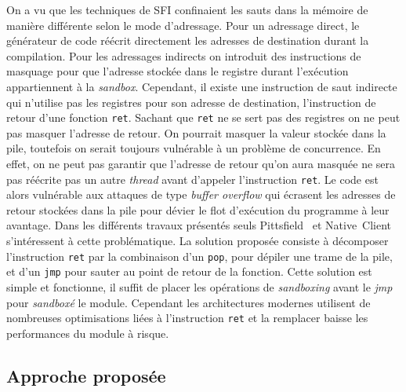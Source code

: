 \documentclass[11pt]{sdm}
\begin{document}
On a vu que les techniques de SFI confinaient les sauts dans la mémoire de manière différente selon le mode d'adressage. Pour un adressage direct, le générateur de code réécrit directement les adresses de destination durant la compilation. Pour les adressages indirects on introduit des instructions de masquage pour que l'adresse stockée dans le registre durant l'exécution appartiennent à la \textit{sandbox}. Cependant, il existe une instruction de saut indirecte qui n'utilise pas les registres pour son adresse de destination, l'instruction de retour d'une fonction \texttt{ret}. 
Sachant que \texttt{ret} ne se sert pas des registres on ne peut pas masquer l'adresse de retour. On pourrait masquer la valeur stockée dans la pile, toutefois on serait toujours vulnérable à un problème de concurrence. En effet, on ne peut pas garantir que l'adresse de retour qu'on aura masquée ne sera pas réécrite pas un autre \textit{thread} avant d'appeler l'instruction \texttt{ret}. Le code est alors vulnérable aux attaques de type \textit{buffer overflow} qui écrasent les adresses de retour stockées dans la pile pour dévier le flot d'exécution du programme à leur avantage.
Dans les différents travaux présentés seuls Pittsfield~\cite{Mccamant_evaluatingsfi} et Native~Client~\cite{Yee:2010:NCS:1629175.1629203} s'intéressent à cette problématique. La solution proposée consiste à décomposer l'instruction \texttt{ret} par la combinaison d'un \texttt{pop}, pour dépiler une trame de la pile, et d'un \texttt{jmp} pour sauter au point de retour de la fonction. Cette solution est simple et fonctionne, il suffit de placer les opérations de \textit{sandboxing} avant le \textit{jmp} pour \textit{sandboxé} le module. Cependant les architectures modernes utilisent de nombreuses optimisations liées à l'instruction \texttt{ret} et la remplacer baisse les performances du module à risque.


\subsection{Approche proposée}
\end{document}

